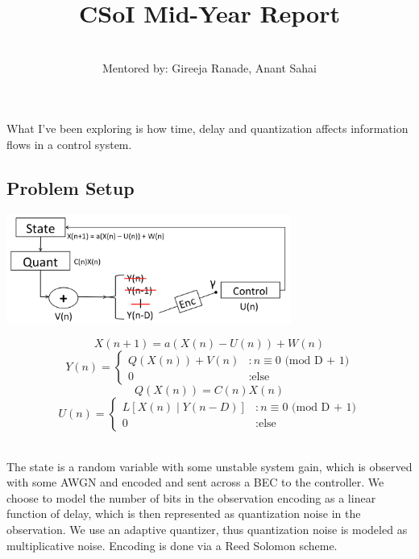 \documentclass[11pt]{article}
\title{\vspace{-5ex} CSoI Mid-Year Report}
\author{\Name \\
Mentored by: Gireeja Ranade, Anant Sahai \vspace{-2ex}}
\date{}
\begin{document}
\maketitle

What I've been exploring is how time, delay and quantization affects information flows in a control system.

\subsection*{Problem Setup}
\begin{minipage}{0.4\textwidth}
\begin{center}
\includegraphics[width=0.7\textwidth]{sys_dynamics} 
\end{center}
\end{minipage}
\begin{minipage}{0.5\textwidth}
\[ X(n+1) = a(X(n) - U(n)) + W(n) \]
\[ Y(n) = \left\{
     \begin{array}{ll}
       Q(X(n)) + V(n) & : n \equiv 0 \text{ (mod D + 1)}\\
       0 & : \text{else}
     \end{array}
   \right. \]
\[ Q(X(n)) = C(n)X(n) \]
\[ U(n) = \left\{
     \begin{array}{ll}
       L[X(n) \; | \; Y(n-D)] & : n \equiv 0 \text{ (mod  D + 1)}\\
       0 & : \text{else}
     \end{array}
   \right. \]
\end{minipage}\\

The state is a random variable with some unstable system gain, which is observed with some AWGN and encoded and sent across a BEC to the controller. We choose to model the number of bits in the observation encoding as a linear function of delay, which is then represented as quantization noise in the observation. We use an adaptive quantizer, thus quantization noise is modeled as multiplicative noise. Encoding is done via a Reed Solomon scheme.
\end{document}
